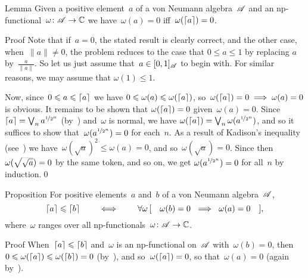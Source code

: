 \documentclass[a]{subfiles}
\begin{document}
\begin{parsec}%
\begin{point}{Lemma}%
Given a positive element~$a$
of a von Neumann algebra~$\mathscr{A}$ and an
np-functional~$\omega\colon \mathscr{A}\to\mathbb{C}$
we have~$\omega(a)=0$ iff~$\omega(\left\lceil a\right\rceil)=0$.
\begin{point}{Proof}%
Note that if~$a=0$,
the stated result is clearly correct,
and the other case, when~$\|a\| \neq 0$,
the problem reduces to the case
that $0\leq a\leq 1$
by replacing $a$ by~$\frac{a}{\|a\|}$.
So let us just assume that~$a\in [0,1]_{\mathscr{A}}$
to begin with.
For similar reasons, we may assume that $\omega (1)\leq 1$.

Now, since~$0\leqslant a\leqslant \left\lceil a\right\rceil$
we have $0\leqslant \omega(a)\leqslant \omega(\left\lceil a\right\rceil)$,
so~$\omega(\left\lceil a\right\rceil)=0\implies \omega(a)=0$
is obvious.
It remains to be shown that $\omega(\left\lceil a\right\rceil)=0$
given~$\omega(a)=0$.
Since  $\left\lceil a\right\rceil=\bigvee_n a^{\nicefrac{1}{2^n}}$ 
(by~)
and~$\omega$ is normal,
we have $\omega(\left\lceil a\right\rceil)=\bigvee_n \omega(a^{\nicefrac{1}{2^n}})$,
and so it suffices to show that~$\omega(a^{\nicefrac{1}{2^n}})=0$
for each~$n$.
As a result of Kadison's inequality
(see~)
we have~$\omega(\sqrt{a})^2\leq \omega(a)=0$,
and so~$\omega(\sqrt{a})=0$.
Since then~$\omega(\smash{\sqrt{\sqrt{a}}})=0$
by the same token, and so on,
we get $\omega(a^{\nicefrac{1}{2^n}})=0$
for all~$n$ by induction.\qed
\end{point}
\end{point}
\begin{point}{Proposition}%
For positive elements~$a$ and~$b$ of a von Neumann algebra~$\mathscr{A}$,
\begin{equation*}
\left\lceil a\right\rceil\leqslant \left\lceil b\right\rceil
\qquad\iff\qquad
\forall \omega\,[\quad\omega(b)=0\  \implies  \ \omega(a)=0\quad ],
\end{equation*}
where~$\omega$ ranges over all np-functionals~$\omega\colon \mathscr{A}\to\mathbb{C}$.
\begin{point}{Proof}%
When~$\left\lceil a\right\rceil\leqslant\left\lceil b\right\rceil$
and~$\omega$ is an np-functional on~$\mathscr{A}$
with~$\omega(b)=0$,
then~$0\leqslant \omega(\left\lceil a\right\rceil)\leqslant \omega(\left\lceil b\right\rceil)=0$
(by~),
and so~$\omega(\left\lceil a\right\rceil)=0$,
so that~$\omega(a)=0$
(again
by~).


\end{point}
\end{point}
\end{parsec}
\end{document}
